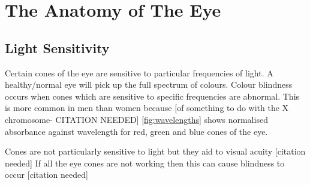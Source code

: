 
\chapter{The Anatomy of The Eye}

\label{anatomy} %


\section{Light Sensitivity}

Certain cones of the eye are sensitive to particular frequencies of light.
A healthy/normal eye will pick up the full spectrum of colours. Colour blindness
occurs when cones which are sensitive to specific frequencies are abnormal.
This is more common in men than women because [of something to do with the X
chromosome- CITATION NEEDED] \ref{fig:wavelengths} shows normalised absorbance
against wavelength for red, green and blue cones of the eye.

Cones are not particularly sensitive to light but they aid to visual acuity
[citation needed] If all the eye cones are not working then this can cause
blindness to occur [citation needed]

